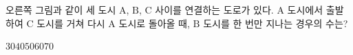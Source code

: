 \hspace*{2mm}\begin{minipage}[t]{\dimexpr\linewidth-2mm\relax}\vspace{0pt}
\noindent\begin{minipage}[t]{0.58\linewidth}\vspace{0pt}\raggedright 오른쪽 그림과 같이 세 도시 $\mathrm{A}$, $\mathrm{B}$, $\mathrm{C}$ 사이를 연결하는 도로가 있다. $\mathrm{A}$ 도시에서 출발하여 $\mathrm{C}$ 도시를 거쳐 다시 $\mathrm{A}$ 도시로 돌아올 때, $\mathrm{B}$ 도시를 한 번만 지나는 경우의 수는?\end{minipage}\hfill\begin{minipage}[t]{0.4\linewidth}\vspace{0pt}\centering \resizebox{\ifdim\width>\linewidth\linewidth\else\width\fi}{!}{}\end{minipage}\par
\begin{choices32}{$30$}{$40$}{$50$}{$60$}{$70$}\end{choices32}\end{minipage}
